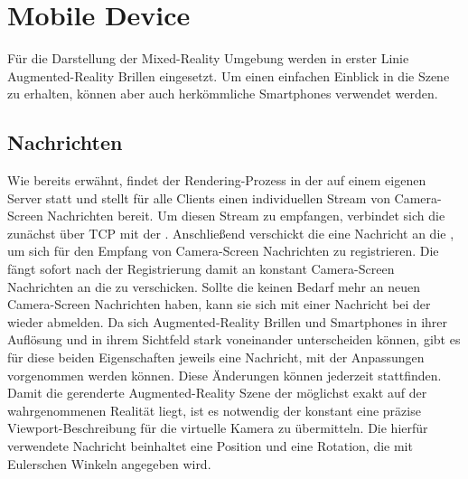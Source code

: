 
\section{Mobile Device} \label{sec:mobiledevice}
Für die Darstellung der Mixed-Reality Umgebung werden in erster Linie Augmented-Reality Brillen eingesetzt.
Um einen einfachen Einblick in die Szene zu erhalten, können aber auch herkömmliche Smartphones verwendet werden.
\subsection{Nachrichten}
Wie bereits erwähnt, findet der Rendering-Prozess in der \visualization auf einem eigenen Server statt und stellt für alle Clients einen individuellen Stream von Camera-Screen Nachrichten bereit.
Um diesen Stream zu empfangen, verbindet sich die \mobileDeviceComponent zunächst über TCP mit der \visualization.
Anschließend verschickt die \mobileDeviceComponent eine Nachricht an die \visualization, um sich für den Empfang von Camera-Screen Nachrichten zu registrieren.
Die \visualization fängt sofort nach der Registrierung damit an konstant Camera-Screen Nachrichten an die \mobileDeviceComponent zu verschicken.
Sollte die \mobileDeviceComponent keinen Bedarf mehr an neuen Camera-Screen Nachrichten haben, kann sie sich mit einer Nachricht bei der \visualization wieder abmelden.
Da sich Augmented-Reality Brillen und Smartphones in ihrer Auflösung und in ihrem Sichtfeld stark voneinander unterscheiden können, gibt es für diese beiden Eigenschaften jeweils eine Nachricht, mit der Anpassungen vorgenommen werden können.
Diese Änderungen können jederzeit stattfinden.
Damit die gerenderte Augmented-Reality Szene der \visualization möglichst exakt auf der wahrgenommenen Realität liegt, ist es notwendig der \visualization konstant eine präzise Viewport-Beschreibung für die virtuelle Kamera zu übermitteln.
Die hierfür verwendete Nachricht beinhaltet eine Position und eine Rotation, die mit Eulerschen Winkeln angegeben wird.
